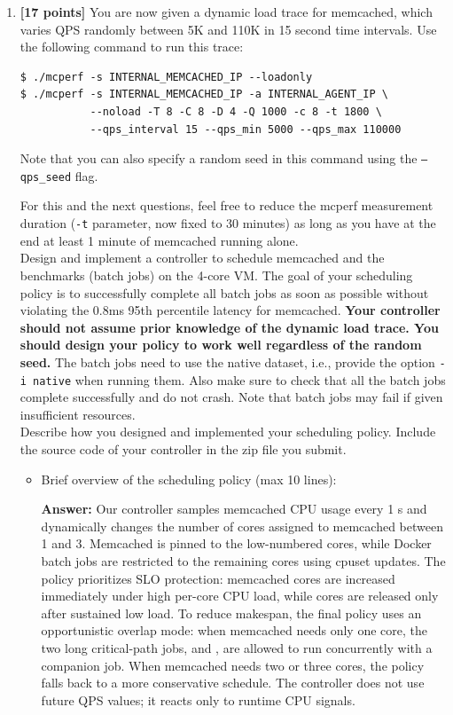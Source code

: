 \begin{enumerate}
    
    \item \textbf{[17 points]} You are now given a dynamic load trace for memcached, which varies QPS randomly between 5K and 110K in 15 second time intervals. Use the following command to run this trace: 
        \begin{Verbatim}[fontsize=\small]
$ ./mcperf -s INTERNAL_MEMCACHED_IP --loadonly 
$ ./mcperf -s INTERNAL_MEMCACHED_IP -a INTERNAL_AGENT_IP \ 
           --noload -T 8 -C 8 -D 4 -Q 1000 -c 8 -t 1800 \ 
           --qps_interval 15 --qps_min 5000 --qps_max 110000
\end{Verbatim}
    
    Note that you can also specify a random seed in this command using the \texttt{--qps\_seed} flag. 

    For this and the next questions, feel free to reduce the mcperf measurement duration (\texttt{-t} parameter, now fixed to 30 minutes) as long as you have at the end at least 1 minute of memcached running alone.
    \\
    
    Design and implement a controller to schedule memcached and the benchmarks (batch jobs) on the 4-core VM. The goal of your scheduling policy is to successfully complete all batch jobs as soon as possible without violating the 0.8ms 95th percentile latency for memcached. \textbf{Your controller should not assume prior knowledge of the dynamic load trace. You should design your policy to work well regardless of the random seed.} The batch jobs need to use the native dataset, i.e., provide the option \texttt{-i native} when running them. Also make sure to check that all the batch jobs complete successfully and do not crash. Note that batch jobs may fail if given insufficient resources. \\
    
    Describe how you designed and implemented your scheduling policy. Include the source code of your controller in the zip file you submit. 

    \begin{itemize}
        \item Brief overview of the scheduling policy (max 10 lines):
        
    \textbf{Answer:}
    Our controller samples memcached CPU usage every 1 s and dynamically changes the number of cores assigned to memcached between 1 and 3. Memcached is pinned to the low-numbered cores, while Docker batch jobs are restricted to the remaining cores using cpuset updates. The policy prioritizes SLO protection: memcached cores are increased immediately under high per-core CPU load, while cores are released only after sustained low load. To reduce makespan, the final policy uses an opportunistic overlap mode: when memcached needs only one core, the two long critical-path jobs,  and , are allowed to run concurrently with a companion job. When memcached needs two or three cores, the policy falls back to a more conservative schedule. The controller does not use future QPS values; it reacts only to runtime CPU signals.
     

\end{itemize}
\end{enumerate}
